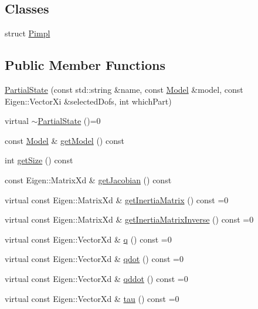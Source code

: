 \subsection*{Classes}
\begin{DoxyCompactItemize}
\item 
struct \hyperlink{structocra_1_1PartialState_1_1Pimpl}{Pimpl}
\end{DoxyCompactItemize}
\subsection*{Public Member Functions}
\begin{DoxyCompactItemize}
\item 
\hyperlink{classocra_1_1PartialState_ab6f225c821033965da2ccd5924c23915}{Partial\+State} (const std\+::string \&name, const \hyperlink{classocra_1_1Model}{Model} \&model, const Eigen\+::\+Vector\+Xi \&selected\+Dofs, int which\+Part)
\item 
virtual \hyperlink{classocra_1_1PartialState_a6426dc8cd115e310f16f0d244802618f}{$\sim$\+Partial\+State} ()=0
\item 
const \hyperlink{classocra_1_1Model}{Model} \& \hyperlink{classocra_1_1PartialState_a6eaee0de04986c5ab54074406d002817}{get\+Model} () const 
\item 
int \hyperlink{classocra_1_1PartialState_a8cd8e791b5f3f2de6523e325633e038e}{get\+Size} () const 
\item 
const Eigen\+::\+Matrix\+Xd \& \hyperlink{classocra_1_1PartialState_a6e341d38905b7eb76532037e822fc6e3}{get\+Jacobian} () const 
\item 
virtual const Eigen\+::\+Matrix\+Xd \& \hyperlink{classocra_1_1PartialState_ad811a25932f0fad439242ebd48841162}{get\+Inertia\+Matrix} () const =0
\item 
virtual const Eigen\+::\+Matrix\+Xd \& \hyperlink{classocra_1_1PartialState_a83979e39dd3631861c724514e49cb8b4}{get\+Inertia\+Matrix\+Inverse} () const =0
\item 
virtual const Eigen\+::\+Vector\+Xd \& \hyperlink{classocra_1_1PartialState_a28f537d2c569eddb7f7d6dbbea073226}{q} () const =0
\item 
virtual const Eigen\+::\+Vector\+Xd \& \hyperlink{classocra_1_1PartialState_a5af623db2ae7e68cb4658f226e8ae006}{qdot} () const =0
\item 
virtual const Eigen\+::\+Vector\+Xd \& \hyperlink{classocra_1_1PartialState_ad12359c11926c2151dc1459e88b9fedc}{qddot} () const =0
\item 
virtual const Eigen\+::\+Vector\+Xd \& \hyperlink{classocra_1_1PartialState_a875575d215c7fe9278d47ff6f392bb84}{tau} () const =0
\end{DoxyCompactItemize}
